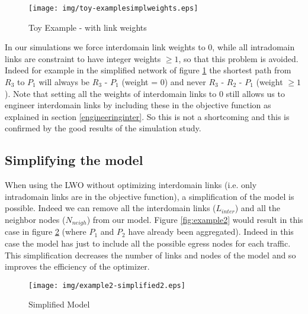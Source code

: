 \documentclass{acm_proc_article-sp}
\begin{document}
\begin{figure}[htbp]
  \centering
  \texttt{[image: img/toy-examplesimplweights.eps]}
  \caption{Toy Example - with link weights}
  \label{fig:toyexamplesimplweights}
\end{figure}

In our simulations we force interdomain link weights to 0, while all
intradomain links are constraint to have integer weights $\ge 1$, so that this
problem is avoided. Indeed for example in the simplified network of
figure \ref{fig:toyexamplesimplweights} the shortest path from $R_3$ to $P_1$ will always be $R_3$ - $P_1$
(weight = 0) and never $R_3$ - $R_2$ - $P_1$ (weight $\ge 1$). Note that
setting all the weights of interdomain links to 0 still allows us to engineer
interdomain links by including these in the objective function as explained
in section \ref{engineeringinter}. So this is not a shortcoming and this is
confirmed by the good results of the simulation study.

\subsection{Simplifying the model}

When using the LWO without optimizing 
interdomain links (i.e. only intradomain links are in the objective
function), a simplification of the model is possible. Indeed we can
remove all the interdomain links ($L_{inter}$) and all the neighbor
nodes ($N_{neigh}$) from our model. Figure \ref{fig:example2} would
result in this case in figure \ref{fig:example2-simplified} (where
$P_1$ and $P_2$ have already been aggregated). Indeed in this case the
model has just to include all the possible egress nodes for each
traffic. This simplification decreases the number of links and nodes
of the model and so improves the efficiency of the optimizer.

\begin{figure}[htbp]
  \centering
  \texttt{[image: img/example2-simplified2.eps]}
  \caption{Simplified Model}
  \label{fig:example2-simplified}
\end{figure}
\end{document}
